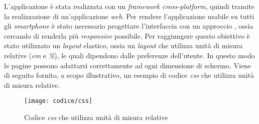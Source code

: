 L'applicazione è stata realizzata con un \textit{framework cross-platform}, quindi tramite la realizzazione di un'applicazione \textit{web}. Per rendere l'applicazione usabile su tutti gli \textit{smartphone} è stato necessario progettare l'interfaccia con un approccio , ossia cercando di renderla più \textit{responsive} possibile. Per raggiungere questo obiettivo è stato utilizzato un \textit{layout} elastico, ossia un \textit{layout} che utilizza unità di misura relative (\textit{em} e \textit{\%}), le quali dipendono dalle preferenze dell'utente. In questo modo le pagine possono adattarsi correttamente ad ogni dimensione di schermo. Viene di seguito fornito, a scopo illustrativo, un esempio di codice \textit{css} che utilizza unità di misura relative.

\begin{figure}[!h] 
    \centering 
    \texttt{[image: codice/css]} 
    \caption{Codice \textit{css} che utilizza unità di misura relative}
\end{figure}